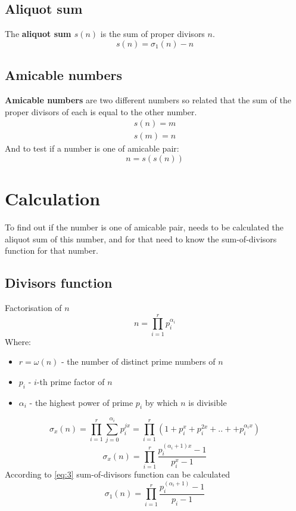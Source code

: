 \documentclass{article}
\begin{document}
\subsection{Aliquot sum}
The \textbf{aliquot sum $s(n)$} is the sum of proper divisors $n$.
\begin{equation*}
    s(n) = \sigma_{1}(n) - n
\end{equation*}

\subsection{Amicable numbers}
\textbf{Amicable numbers} are two different numbers so related that the sum of the proper divisors of each is equal to the other number.
\begin{equation*}
    \begin{split}
        s(n) = m \\
        s(m) = n
    \end{split}
\end{equation*}
And to test if a number is one of amicable pair:
\begin{equation*}
        n = s(s(n))
\end{equation*}

\section{Calculation}
To find out if the number is one of amicable pair, needs to be calculated the aliquot sum of this number,
and for that need to know the sum-of-divisors function for that number.

\subsection{Divisors function}
Factorisation of $n$
\begin{equation}
    n = \prod_{i=1}^{r}{p_{i}^{\alpha_{i}}}
\end{equation}
Where:
\begin{itemize}
    \item $r = \omega(n)$ - the number of distinct prime numbers of $n$
    \item $p_{i}$ - $i$-th prime factor of $n$
    \item $\alpha_{i}$ - the highest power of prime $p_{i}$ by which $n$ is divisible
\end{itemize}
\begin{equation}
    \sigma_{x}(n) = \prod_{i=1}^{r}{ \sum_{j=0}^{\alpha_{i}}{p_{i}^{jx}}} = 
    \prod_{i=1}^{r}{(1 + p_{i}^{x} + p_{i}^{2x} + .. + + p_{i}^{\alpha_{i}x})}
\end{equation}
\begin{equation} \label{eq:3}
    \sigma_{x}(n) = \prod_{i=1}^{r}{  \frac{p_{i}^{(\alpha_{i}+1)x } - 1}{p_{i}^{x} - 1} }
\end{equation}
According to \eqref{eq:3} sum-of-divisors function can be calculated
\begin{equation} 
    \sigma_{1}(n) = \prod_{i=1}^{r}{  \frac{p_{i}^{(\alpha_{i}+1) } - 1}{p_{i} - 1} }
\end{equation}
\end{document}
